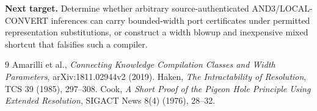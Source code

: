 \documentclass[11pt]{article}
\begin{document}
\noindent\textbf{Next target.} Determine whether arbitrary source-authenticated AND3/LOCAL-CONVERT inferences can carry bounded-width port certificates under permitted representation substitutions, or construct a width blowup and inexpensive mixed shortcut that falsifies such a compiler.
\begin{thebibliography}{9}
 Amarilli et al., \emph{Connecting Knowledge Compilation Classes and Width Parameters}, arXiv:1811.02944v2 (2019).
 Haken, \emph{The Intractability of Resolution}, TCS 39 (1985), 297--308.
 Cook, \emph{A Short Proof of the Pigeon Hole Principle Using Extended Resolution}, SIGACT News 8(4) (1976), 28--32.
\end{thebibliography}
\end{document}
